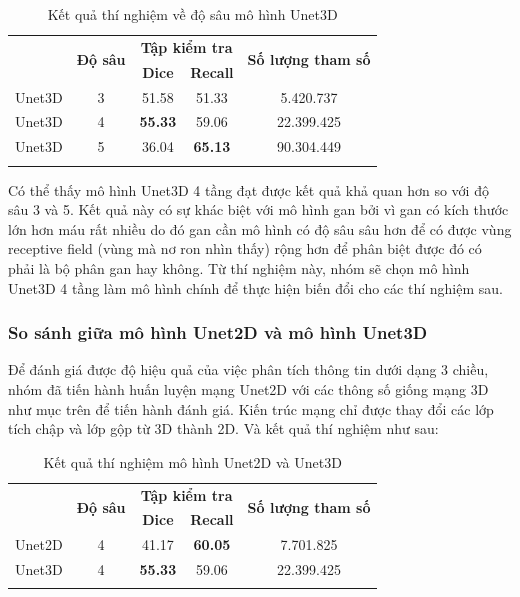 \begin{table}[H]
\centering
\begin{tabular}{c|c|c|c|c}
\Xhline{3\arrayrulewidth}
\multirow{2}{*}{\textbf{Mô hình}} & \multirow{2}{*}{\textbf{Độ sâu}} & \multicolumn{2}{c|}{\textbf{Tập kiểm tra}} & \multirow{2}{*}{\textbf{Số lượng tham số}} \\ 
\cline{3-4} 
&       &\textbf{Dice}       & \textbf{Recall}    &                 \\ \hline
Unet3D  & 3 & 51.58               & 51.33              & 5.420.737       \\ \hline
Unet3D  & 4 & \textbf{55.33}      & 59.06              & 22.399.425      \\ \hline
Unet3D  & 5 & 36.04               & \textbf{65.13}     & 90.304.449      \\

\Xhline{3\arrayrulewidth}
\end{tabular}
\caption{Kết quả thí nghiệm về độ sâu mô hình Unet3D}
\end{table}

Có thể thấy mô hình Unet3D 4 tầng đạt được kết quả khả quan hơn so với độ sâu 3 và 5. Kết quả này có sự khác biệt với mô hình gan bởi vì gan có kích thước lớn hơn máu rất nhiều do đó gan cần mô hình có độ sâu sâu hơn để có được vùng receptive field (vùng mà nơ ron nhìn thấy) rộng hơn để phân biệt được đó có phải là bộ phân gan hay không. Từ thí nghiệm này, nhóm sẽ chọn mô hình Unet3D 4 tầng làm mô hình chính để thực hiện biến đổi cho các thí nghiệm sau.

\subsubsection{So sánh giữa mô hình Unet2D và mô hình Unet3D} \label{exp:2dvs3d}
Để đánh giá được độ hiệu quả của việc phân tích thông tin dưới dạng 3 chiều, nhóm đã tiến hành huấn luyện mạng Unet2D với các thông số giống mạng 3D như mục trên để tiến hành đánh giá. Kiến trúc mạng chỉ được thay đổi các lớp tích chập và lớp gộp từ 3D thành 2D. Và kết quả thí nghiệm như sau:

\begin{table}[H]
    \centering
    \begin{tabular}{c|c|c c| c}
    \Xhline{3\arrayrulewidth}
    \multirow{2}{*}{\textbf{Mô hình}} & \multirow{2}{*}{\textbf{Độ sâu}} & \multicolumn{2}{c|}{\textbf{Tập kiểm tra}} & \multirow{2}{*}{\textbf{Số lượng tham số}} \\ 
    \cline{3-4}
             & & \textbf{Dice} & \textbf{Recall} &  \\ \hline
    Unet2D   & 4 & 41.17 & \textbf{60.05} & 7.701.825 \\ \hline
    Unet3D   & 4 & \textbf{55.33}  & 59.06  & 22.399.425 \\ 
    
    \Xhline{3\arrayrulewidth}
    \end{tabular}
    \caption{Kết quả thí nghiệm mô hình Unet2D và Unet3D}
\end{table}
\vspace{-0.6cm}

